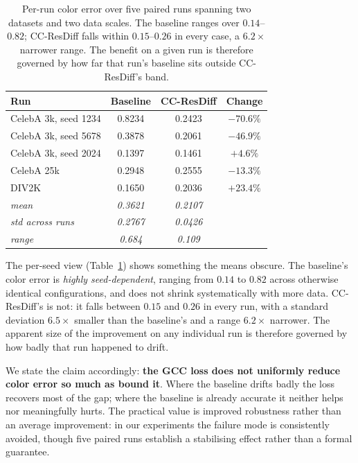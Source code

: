 \documentclass[11pt]{article}
\begin{document}
\begin{table}[t]
\centering
\small
\begin{tabular}{lccc}
\toprule
Run & Baseline & CC-ResDiff & Change \\
\midrule
CelebA 3k, seed 1234  & 0.8234 & 0.2423 & $-70.6\%$ \\
CelebA 3k, seed 5678  & 0.3878 & 0.2061 & $-46.9\%$ \\
CelebA 3k, seed 2024  & 0.1397 & 0.1461 & $+4.6\%$ \\
CelebA 25k            & 0.2948 & 0.2555 & $-13.3\%$ \\
DIV2K                 & 0.1650 & 0.2036 & $+23.4\%$ \\
\midrule
\emph{mean}            & \emph{0.3621} & \emph{0.2107} & \\
\emph{std across runs} & \emph{0.2767} & \emph{0.0426} & \\
\emph{range}           & \emph{0.684}  & \emph{0.109}  & \\
\bottomrule
\end{tabular}
\caption{Per-run color error over five paired runs spanning two datasets and two
data scales. The baseline ranges over $0.14$--$0.82$; CC-ResDiff falls within
$0.15$--$0.26$ in every case, a $6.2\times$ narrower range. The benefit on a given
run is therefore governed by how far that run's baseline sits outside
CC-ResDiff's band.}
\label{tab:perseed}
\end{table}

The per-seed view (Table~\ref{tab:perseed}) shows something the means obscure.
The baseline's color error is \emph{highly seed-dependent}, ranging from $0.14$
to $0.82$ across otherwise identical configurations, and does not shrink
systematically with more data. CC-ResDiff's is not: it
falls between $0.15$ and $0.26$ in every run, with a standard deviation
$6.5\times$ smaller than the baseline's and a range $6.2\times$ narrower. The
apparent size of the improvement on any individual run is therefore governed
by how badly that run happened to drift.

We state the claim accordingly: \textbf{the GCC loss does not uniformly reduce
color error so much as bound it}. Where the baseline drifts badly the loss
recovers most of the gap; where the baseline is already accurate it neither helps
nor meaningfully hurts. The practical value is improved robustness rather than an average
improvement: in our experiments the failure mode is consistently avoided, though
five paired runs establish a stabilising effect rather than a formal guarantee.
\end{document}

